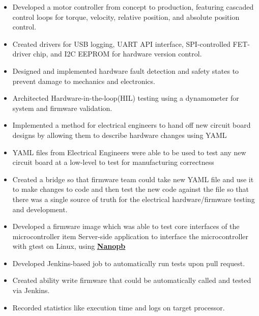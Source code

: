 \documentclass[10pt,a4paper,ragged2e,withhyper]{altacv}
\begin{document}
\begin{paracol}{2}
\divider

\begin{itemize}
\item Developed a motor controller from concept to production, featuring cascaded control loops for torque, velocity, relative position, and absolute position control.
\item Created drivers for USB logging, UART API interface, SPI-controlled FET-driver chip, and I2C EEPROM for hardware version control.
\item Designed and implemented hardware fault detection and safety states to prevent damage to mechanics and electronics.
\item Architected Hardware-in-the-loop(HIL) testing using a dynamometer for system and firmware validation.
\end{itemize}

\end{paracol}
\newpage


\begin{itemize}
\item Implemented a method for electrical engineers to hand off new circuit board designs by allowing them to describe hardware changes using YAML
\item YAML files from Electrical Engineers were able to be used to test any new circuit board at a low-level to test for manufacturing correctness
\item Created a bridge so that firmware team could take new YAML file and use it to make changes to code and then test the new code against the file so that there was a single source of truth for the electrical hardware/firmware testing and development.
\end{itemize}
\divider

\begin{itemize}
\item Developed a firmware image which was able to test core interfaces of the microcontroller
item Server-side application to interface the microcontroller with gtest on Linux, using  \underline{\textbf{\href{https://github.com/nanopb/nanopb}{Nanopb}}}
\item Developed Jenkins-based job to automatically run tests upon pull request.
\item Created ability write firmware that could be automatically called and tested via Jenkins.
\item Recorded statistics like execution time and logs on target processor.
\end{itemize}
\end{document}
